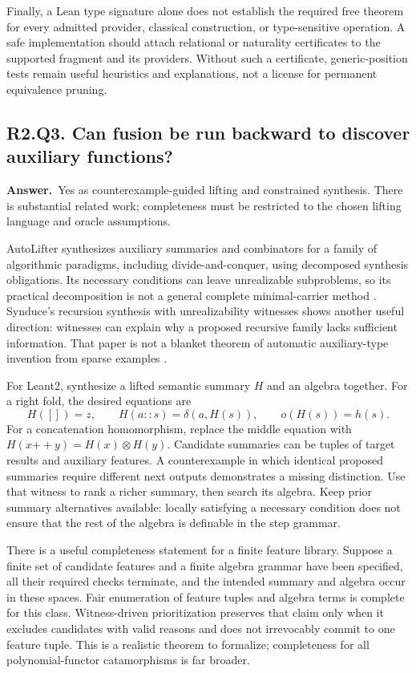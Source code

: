 \documentclass[11pt,a4paper]{article}
\theoremstyle{definition}
\theoremstyle{remark}
\newcommand{\cat}{\mathbin{+\!+}}
\newcommand{\answer}{\par\noindent\textbf{Answer.}\ }
\newcommand{\qheading}[2]{\subsection{#1. #2}}
\begin{document}
Finally, a Lean type signature alone does not establish the required free
theorem for every admitted provider, classical construction, or type-sensitive
operation. A safe implementation should attach relational or naturality
certificates to the supported fragment and its providers. Without such a
certificate, generic-position tests remain useful heuristics and explanations,
not a license for permanent equivalence pruning.

\qheading{R2.Q3}{Can fusion be run backward to discover auxiliary functions?}
\answer Yes as counterexample-guided lifting and constrained synthesis. There
is substantial related work; completeness must be restricted to the chosen
lifting language and oracle assumptions.

AutoLifter synthesizes auxiliary summaries and combinators for a family of
algorithmic paradigms, including divide-and-conquer, using decomposed synthesis
obligations. Its necessary conditions can leave unrealizable subproblems, so
its practical decomposition is not a general complete minimal-carrier method
\cite{autolifter}. Synduce's recursion synthesis with unrealizability witnesses
shows another useful direction: witnesses can explain why a proposed recursive
family lacks sufficient information. That paper is not a blanket theorem of
automatic auxiliary-type invention from sparse examples \cite{synduce}.

For Leant2, synthesize a lifted semantic summary $H$ and an algebra together.
For a right fold, the desired equations are
\[
 H([])=z,\qquad H(a::s)=\delta(a,H(s)),\qquad o(H(s))=h(s).
 \tag{7}\label{eq:lift}
\]
For a concatenation homomorphism, replace the middle equation with
$H(x\cat y)=H(x)\otimes H(y)$. Candidate summaries can be tuples of target
results and auxiliary features. A counterexample in which identical proposed
summaries require different next outputs demonstrates a missing distinction.
Use that witness to rank a richer summary, then search its algebra. Keep prior
summary alternatives available: locally satisfying a necessary condition does
not ensure that the rest of the algebra is definable in the step grammar.

There is a useful completeness statement for a finite feature library. Suppose
a finite set of candidate features and a finite algebra grammar have been
specified, all their required checks terminate, and the intended summary and
algebra occur in these spaces. Fair enumeration of feature tuples and algebra
terms is complete for this class. Witness-driven prioritization preserves that
claim only when it excludes candidates with valid reasons and does not
irrevocably commit to one feature tuple. This is a realistic theorem to
formalize; completeness for all polynomial-functor catamorphisms is far broader.
\end{document}
